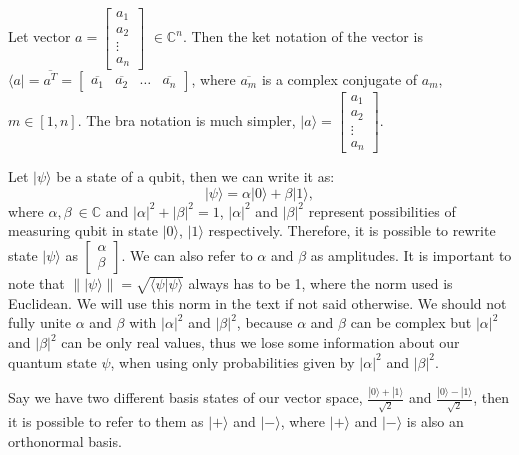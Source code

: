 Let vector $ a =
%
%
\begin{bmatrix}
     a_1\\
     a_2\\
     \vdots\\
     a_n
\end{bmatrix}$ 
%
%
$\in \mathbb{C}^n $. Then the ket notation of the vector is $ \langle a| = \overline{a^T} = 
%
%
\begin{bmatrix}
     \overline{a_1}& \overline{a_2} &  \hdots & \overline{a_n}
\end{bmatrix}$, where $\overline{a_m}$ is a complex conjugate of $a_m$, $m \in [1,n]$. The bra notation is much simpler, $|a\rangle = 
\begin{bmatrix}
     a_1\\
     a_2\\
     \vdots\\
     a_n
\end{bmatrix}$.

Let $| \psi \rangle$ be a  state of a qubit, then we can write it as:
\begin{equation} \label{basic_quantum_state}
    |\psi\rangle = \alpha |0\rangle +\beta |1\rangle ,
\end{equation}
where $\alpha, \beta \ \in \mathbb{C}$ and  $|\alpha|^2 + |\beta|^2 = 1$, $|\alpha| ^2$ and $|\beta| ^2$ represent possibilities of measuring qubit in state $| 0 \rangle$, $|1\rangle$ respectively. Therefore, it is possible to rewrite state $| \psi \rangle$ as
$\begin{bmatrix} \label{zakladni_popis_qubitu}
    \alpha \\
    \beta
\end{bmatrix}$. \label{one_qubit_} We can also refer to $\alpha$ and $\beta$ as amplitudes. It is important to note that $\lVert | \psi \rangle \rVert = \sqrt{\langle \psi | \psi \rangle}$ always has to be 1, where the norm used is Euclidean. We will use this norm in the text if not said otherwise. We should not fully unite $\alpha$ and $\beta$ with $|\alpha| ^2$ and $|\beta| ^2$, because  $\alpha$ and $\beta$ can be complex but $|\alpha| ^2$ and $|\beta| ^2$ can be only real values, thus we lose some information about our quantum state $\psi$, when using only probabilities given by $|\alpha| ^2$ and $|\beta| ^2$.

Say we have two different basis states of our vector space, $\frac{|0\rangle + |1\rangle}{\sqrt{2}}$ and $ \frac{|0\rangle - |1\rangle}{\sqrt{2}}$, then it is possible to refer to them as $|+\rangle$ and $|-\rangle$, where $|+\rangle$ and $|-\rangle$ is also an orthonormal basis.



